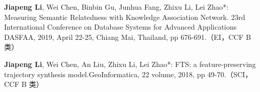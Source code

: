 






\begin{publications}{99}

\item \textbf{Jiapeng Li}, Wei Chen, Binbin Gu, Junhua Fang, Zhixu Li, Lei Zhao*: Measuring Semantic Relatedness with Knowledge Association Network. 23rd International Conference on Database Systems for Advanced Applications DASFAA, 2019, April 22-25, Chiang Mai, Thailand, pp 676-691.（EI，CCF B 类）


\item \textbf{Jiapeng Li}, Wei Chen, An Liu, Zhixu Li, Lei Zhao*: FTS: a feature-preserving trajectory synthesis model.GeoInformatica, 22 volume, 2018, pp 49-70.（SCI，CCF B 类）

\end{publications}
